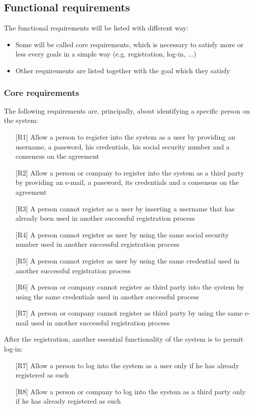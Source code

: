 \subsection{Functional requirements}
\par
The functional requirements will be listed with different way:
\begin{itemize}
\item Some will be called core requirements, which is necessary to satisfy more or less every goals in a simple way (e.g. registration, log-in, ...)
\item Other requirements are listed together with the goal which they satisfy
\end{itemize}

\subsubsection{Core requirements}
\par
The following requirements are, principally, about identifying a specific person on the system:
\begin{itemize}
\item[{[R1]}] Allow a person to register into the system as a user by providing an username, a password, his credentials, his social security number and a consensus on the agreement
\item[{[R2]}] Allow a person or company to register into the system as a third party by providing an e-mail, a password, its credentials and a consensus on the agreement
\item[{[R3]}] A person cannot register as a user by inserting a username that has already been used in another successful registration process
\item[{[R4]}] A person cannot register as user by using the same social security number used in another successful registration process 
\item[{[R5]}] A person cannot register as user by using the same credential used in another successful registration process 
\item[{[R6]}] A person or company cannot register as third party into the system by using the same credentials used in another successful process
\item[{[R7]}] A person or company cannot register as third party by using the same e-mail used in another successful registration process
\end{itemize}
\par
After the registration, another essential functionality of the system is to permit log-in:
\begin{itemize}
\item[{[R7]}] Allow a person to log into the system as a user only if he has already registered as such
\item[{[R8]}] Allow a person or company to log into the system as a third party only if he has already registered as such
\end{itemize}

